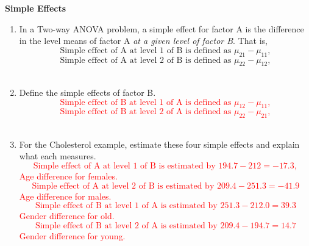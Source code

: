 \textbf{Simple Effects}
\begin{enumerate}
\item In a Two-way ANOVA problem, a simple effect for factor A is the difference in the level means of factor A \textit{at a given level of factor B}.  That is,\\
$$\text{Simple effect of A at level }1\text{ of B is defined as }\mu_{21}-\mu_{11},$$ 
$$\text{Simple effect of A at level }2\text{ of B is defined as }\mu_{22}-\mu_{12},$$ ~\\
\item Define the simple effects of factor B.
\textcolor{red}{\\
$$\text{Simple effect of B at level }1\text{ of A is defined as }\mu_{12}-\mu_{11},$$ 
$$\text{Simple effect of B at level }2\text{ of A is defined as }\mu_{22}-\mu_{21},$$} ~\\
\item For the Cholesterol example, estimate these four simple effects and explain what each measures.
\textcolor{red}{\\
$$\text{Simple effect of A at level }1\text{ of B is estimated by }194.7-212=-17.3,$$ 
Age difference for females.
$$\text{Simple effect of A at level }2\text{ of B is estimated by }209.4-251.3=-41.9$$ 
Age difference for males.
$$\text{Simple effect of B at level }1\text{ of A is estimated by }251.3-212.0=39.3$$ 
Gender difference for old.
$$\text{Simple effect of B at level }2\text{ of A is estimated by }209.4-194.7=14.7$$
Gender difference for young.}
\end{enumerate}

\newpage


